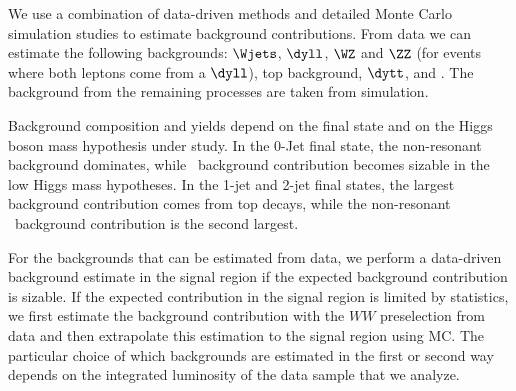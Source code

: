 We use a combination of data-driven methods and detailed Monte Carlo
simulation studies to estimate background contributions.  From data we
can estimate the following backgrounds: $\Wjets$, $\dyll$, $\WZ$ and
$\ZZ$ (for events where both leptons come from a $\dyll$), top
background, $\dytt$, and \WW{}. The background from the remaining processes 
are taken from simulation.

Background composition and yields depend on the final state and on
the Higgs boson mass hypothesis under study. In the 0-Jet final state, 
the non-resonant \WW{} background dominates, while \wjets\ background contribution 
becomes sizable in the low Higgs mass hypotheses. 
In the 1-jet and 2-jet final states, the largest background contribution comes from 
top decays, while the non-resonant \ww\ background contribution is the second largest. 

For the backgrounds that can be estimated from data, 
we perform a data-driven background estimate in the signal region 
if the expected background contribution is sizable. 
If the expected contribution in the signal region is limited by statistics, 
we first estimate the background contribution with the $WW$ preselection from data 
and then extrapolate this estimation to the signal region using MC. The particular
choice of which backgrounds are estimated in the first or second way depends on the
integrated luminosity of the data sample that we analyze.
